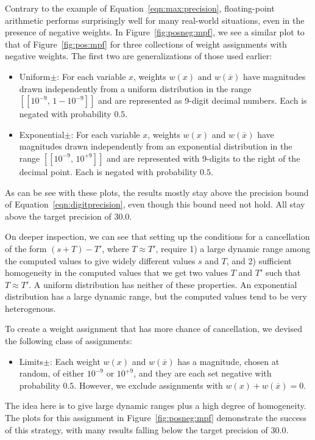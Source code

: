 \documentclass[letterpaper,USenglish,cleveref, autoref, thm-restate]{lipics-v2021}
\newcommand{\obar}[1]{\overline{#1}}
\newcommand{\interval}[1]{[\![#1]\!]}
\begin{document}
Contrary to the example of
Equation~\ref{eqn:max:precision},
floating-point arithmetic performs surprisingly well for
many real-world
situations, even in the presence of negative weights.
In Figure~\ref{fig:posneg:mpf}, we see a similar plot to that of Figure~\ref{fig:pos:mpf} for
three collections of weight assignments with negative weights.  The first two are generalizations of those used earlier:
\begin{itemize}
\item \textsf{Uniform$\pm$}: For each variable $x$, weights $w(x)$ and $w(\obar{x})$ have magnitudes drawn independently
from a uniform distribution in the range  $\interval{10^{-9},\,1-10^{-9}}$ and are represented as 9-digit decimal numbers.  Each is negated with probability $0.5$.
\item \textsf{Exponential$\pm$}: For each variable $x$, weights $w(x)$ and $w(\obar{x})$ have magnitudes
  drawn independently from an exponential distribution in the range $\interval{10^{-9},\,10^{+9}}$ and are represented with 9-digits to the right of the decimal point.  Each is negated with probability $0.5$.
\end{itemize}
As can be see with these plots, the results mostly stay above the precision bound of Equation~\ref{eqn:digitprecision},
even though this bound need not hold.  All stay above the target precision of $30.0$.

On deeper inspection, we can see that setting up the conditions for a
cancellation of the form $(s + T) - T'$, where $T \approx T'$, require
1) a large dynamic range among the computed values to give widely different values $s$ and $T$, and 2) sufficient
homogeneity in the computed values that we get two values $T$ and
$T'$ such that $T \approx T'$.  A uniform distribution has neither of
these properties.  An exponential distribution has a large dynamic
range, but the computed values tend to be very heterogenous.

To create a weight assignment that has more chance of cancellation, we devised the following class of assignments:
\begin{itemize}
\item\textsf{Limits$\pm$}:  Each weight $w(x)$ and $w(\obar{x})$ has a magnitude, chosen at random, of either $10^{-9}$ or $10^{+9}$, and they are each set negative with probability $0.5$.
  However, we exclude assignments with $w(x) + w(\obar{x}) = 0$.
\end{itemize}
The idea here is to give large dynamic ranges plus a high degree of
homogeneity.  The plots for this assignment in
Figure~\ref{fig:posneg:mpf} demonstrate the success of this strategy,
with many results falling below the target precision of $30.0$.
\end{document}
